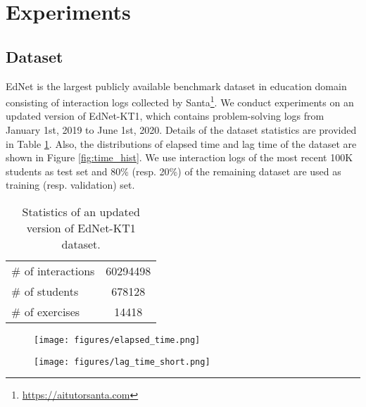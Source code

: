 \section{Experiments} \label{sec:exp}
\subsection{Dataset}
EdNet \cite{choi2020ednet} is the largest publicly available benchmark dataset in education domain consisting of interaction logs collected by Santa\footnote{\url{https://aitutorsanta.com}}.
We conduct experiments on an updated version of EdNet-KT1, which contains problem-solving logs from January 1st, 2019 to June 1st, 2020.
Details of the dataset statistics are provided in Table \ref{tab:ednet}.
Also, the distributions of elapsed time and lag time of the dataset are shown in Figure \ref{fig:time_hist}.
We use interaction logs of the most recent 100K students as test set and 80\% (resp. 20\%) of the remaining dataset are used as training (resp. validation) set. 

\begin{table}[ht]
\caption{Statistics of an updated version of EdNet-KT1 dataset.}
\centering
\begin{tabular}{l|c}\toprule
\# of interactions & 60294498 \\
\# of students & 678128 \\
\# of exercises & 14418 \\
\bottomrule
\end{tabular}
\label{tab:ednet}
\end{table}

\begin{figure*}
    \centering
    \begin{subfigure}{0.4\textwidth}
        \texttt{[image: figures/elapsed\_time.png]}
    \end{subfigure}
    \begin{subfigure}{0.4\textwidth}
        \texttt{[image: figures/lag\_time\_short.png]}
    \end{subfigure}
    \caption{Distributions of elapsed time and lag time in an updated version of EdNet-KT1.}
    \label{fig:time_hist}
\end{figure*}

